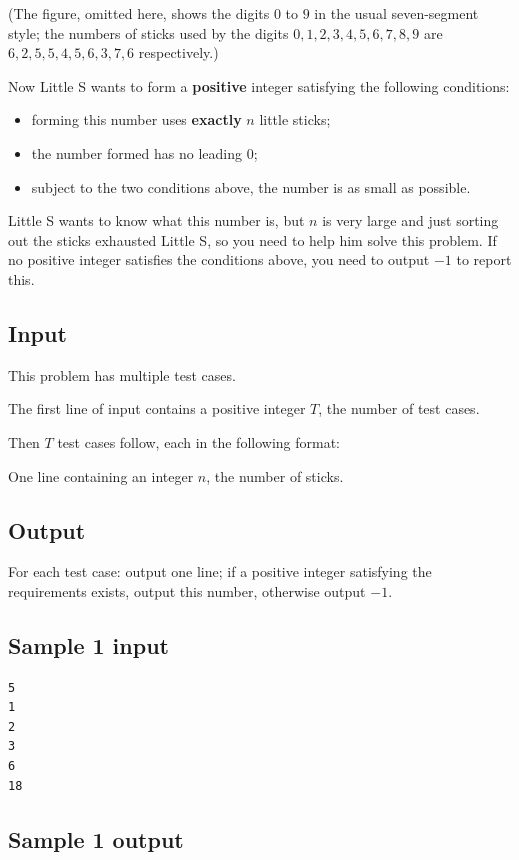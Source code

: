 \documentclass[11pt]{article}
\begin{document}
(The figure, omitted here, shows the digits $0$ to $9$ in the usual
seven-segment style; the numbers of sticks used by the digits
$0, 1, 2, 3, 4, 5, 6, 7, 8, 9$ are $6, 2, 5, 5, 4, 5, 6, 3, 7, 6$
respectively.)

Now Little S wants to form a \textbf{positive} integer satisfying the
following conditions:

\begin{itemize}
\item forming this number uses \textbf{exactly} $n$ little sticks;
\item the number formed has no leading $0$;
\item subject to the two conditions above, the number is as small as
possible.
\end{itemize}

Little S wants to know what this number is, but $n$ is very large and just
sorting out the sticks exhausted Little S, so you need to help him solve
this problem.
If no positive integer satisfies the conditions above, you need to output
$-1$ to report this.

\subsection*{Input}

This problem has multiple test cases.

The first line of input contains a positive integer $T$, the number of test
cases.

Then $T$ test cases follow, each in the following format:

One line containing an integer $n$, the number of sticks.

\subsection*{Output}

For each test case: output one line; if a positive integer satisfying the
requirements exists, output this number, otherwise output $-1$.

\subsection*{Sample 1 input}

\begin{verbatim}
5
1
2
3
6
18
\end{verbatim}

\subsection*{Sample 1 output}
\end{document}
